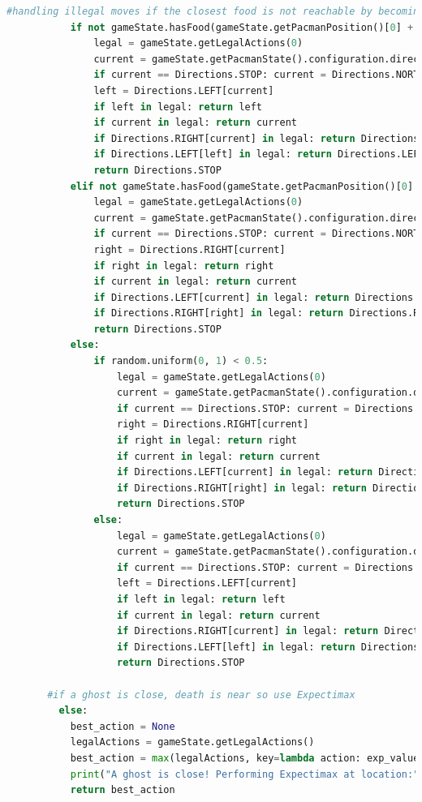 \documentclass{article}
\begin{document}
\begin{lstlisting}[language=Python, caption=The HybridAgent class]
	       #handling illegal moves if the closest food is not reachable by becoming a right turn or left turn reflex agent
	       if not gameState.hasFood(gameState.getPacmanPosition()[0] + 1, gameState.getPacmanPosition()[1]) and gameState.hasFood(gameState.getPacmanPosition()[0] - 1, gameState.getPacmanPosition()[1]):
	           legal = gameState.getLegalActions(0)
	           current = gameState.getPacmanState().configuration.direction
	           if current == Directions.STOP: current = Directions.NORTH
	           left = Directions.LEFT[current]
	           if left in legal: return left
	           if current in legal: return current
	           if Directions.RIGHT[current] in legal: return Directions.RIGHT[current]
	           if Directions.LEFT[left] in legal: return Directions.LEFT[left]
	           return Directions.STOP
	       elif not gameState.hasFood(gameState.getPacmanPosition()[0] - 1, gameState.getPacmanPosition()[1]) and gameState.hasFood(gameState.getPacmanPosition()[0] + 1, gameState.getPacmanPosition()[1]):
	           legal = gameState.getLegalActions(0)
	           current = gameState.getPacmanState().configuration.direction
	           if current == Directions.STOP: current = Directions.NORTH
	           right = Directions.RIGHT[current]
	           if right in legal: return right
	           if current in legal: return current
	           if Directions.LEFT[current] in legal: return Directions.LEFT[current]
	           if Directions.RIGHT[right] in legal: return Directions.RIGHT[right]
	           return Directions.STOP
	       else:
	           if random.uniform(0, 1) < 0.5: 
	               legal = gameState.getLegalActions(0)
	               current = gameState.getPacmanState().configuration.direction
	               if current == Directions.STOP: current = Directions.NORTH
	               right = Directions.RIGHT[current]
	               if right in legal: return right
	               if current in legal: return current
	               if Directions.LEFT[current] in legal: return Directions.LEFT[current]
	               if Directions.RIGHT[right] in legal: return Directions.RIGHT[right]
	               return Directions.STOP
	           else:
	               legal = gameState.getLegalActions(0)
	               current = gameState.getPacmanState().configuration.direction
	               if current == Directions.STOP: current = Directions.NORTH
	               left = Directions.LEFT[current]
	               if left in legal: return left
                   if current in legal: return current
	               if Directions.RIGHT[current] in legal: return Directions.RIGHT[current]
	               if Directions.LEFT[left] in legal: return Directions.LEFT[left]
	               return Directions.STOP
	
	   #if a ghost is close, death is near so use Expectimax
		 else:
	       best_action = None
 	       legalActions = gameState.getLegalActions()
	       best_action = max(legalActions, key=lambda action: exp_value(gameState.generateSuccessor(0, action), 1, 1))
	       print("A ghost is close! Performing Expectimax at location:", gameState.getPacmanPosition())
	       return best_action	
\end{lstlisting}
\end{document}
